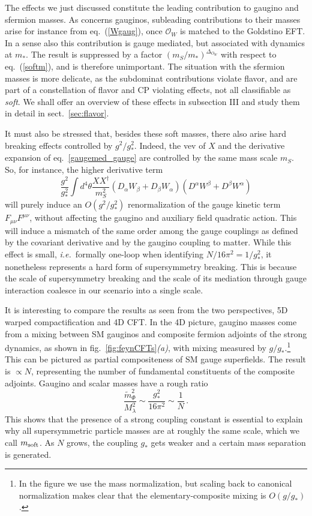 \documentclass[a4paper,12pt]{article}
\newcommand{\ie}{{\em i.e.}}
\newcommand{\be}{\begin{equation}}
\newcommand{\ee}{\end{equation}}
\newcommand{\beq}{\begin{equation}}
\newcommand{\eeq}{\end{equation}}
\def\eq#1{eq.~(\ref{#1})}
\def\fig#1{fig.~\ref{#1}}
\def\eq#1{eq.~(\ref{#1})}
\def\fig#1{fig.~\ref{#1}}
\def\sec#1{sect.~\ref{#1}}
\def\O{\mathcal{O}}
\def\mst{m_*}
\def\mS{m_S}
\def\msoft{m_{\rm soft}}
\begin{document}
The effects we just discussed constitute the leading contribution to gaugino and sfermion masses. As concerns gauginos, subleading contributions to their masses arise  for instance from  \eq{Wgaug}, once $\O_W$ is matched to the Goldstino EFT. In a sense also this contribution is gauge mediated, but associated with dynamics at $\mst$. The result   is  suppressed by a factor $(\mS/\mst)^{\Delta_{O_W}}$ with respect to \eq{softm}, and is therefore unimportant.
The situation with the sfermion masses is more delicate, as the subdominat contributions violate flavor, and are part of a constellation of flavor and CP violating effects, not all classifiable as {\it soft}. We shall offer an overview of these effects in subsection III and study them in detail  in \sec{sec:flavor}.

It must also be stressed that, besides these soft masses, there also arise hard breaking effects controlled by  $g^2/g_*^2$. Indeed, the vev of $X$ and the derivative expansion of eq.~\eqref{gaugemed_gauge}  are controlled by the same mass scale $m_S$. So, for instance, the higher derivative term
\be
\label{hardgauge}
\frac{g^2}{g_*^2} \int d^4 \theta \frac{XX^\dagger}{m_S^2} \left (D_\alpha W_\beta+D_\beta W_\alpha\right )\left (D^\alpha W^\beta+D^\beta W^\alpha\right )
\ee
will purely induce an $O(g^2/g_*^2)$ renormalization of the  gauge kinetic term $F_{\mu\nu}F^{\mu\nu}$, without affecting the gaugino and auxiliary field quadratic action. This will induce a mismatch of the same order among  the gauge couplings  as defined by the covariant derivative and by the gaugino coupling to matter. While this effect is small, \ie~formally one-loop when identifying $N/16\pi^2= 1/g_*^2$, it nonetheless represents a hard form of supersymmetry breaking. This is because the scale of supersymmetry breaking and the scale of its mediation through gauge interaction coalesce in our scenario into a single scale.

It is interesting to compare the results as seen from the two perspectives, 5D warped compactification and 4D CFT. In the 4D  picture, gaugino masses come from a mixing between SM gauginos and composite fermion adjoints of the strong dynamics, as shown in \fig{fig:feynCFTs}{\it (a)}, with mixing measured by  $g/g_*$.\footnote {In the figure we use the  mass normalization, but scaling back to canonical normalization makes clear that the elementary-composite mixing is $O(g/g_*)$.} This can be pictured as  partial compositeness of SM gauge superfields. The result is $\propto N$,  representing the number of fundamental constituents of the composite adjoints. Gaugino and scalar masses have a rough ratio
\beq
\frac{{\tilde m}_\Phi^2}{M_{\lambda}^2}\sim \frac{g_*^2}{16\pi^2} \sim \frac1N\, .
\label{masrat}
\eeq
This shows that the presence of a strong coupling constant is essential to explain why all supersymmetric particle masses are at roughly the same scale, which we call $\msoft$. As $N$ grows, the coupling $g_*$ gets weaker and a certain mass separation is generated.
\end{document}
